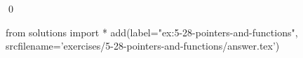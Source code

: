 
\begin{ex}
  \label{ex:5-28-pointers-and-functions}
  
  \qed
\end{ex}
\begin{python0}
from solutions import *
add(label="ex:5-28-pointers-and-functions",
    srcfilename='exercises/5-28-pointers-and-functions/answer.tex')
\end{python0}
